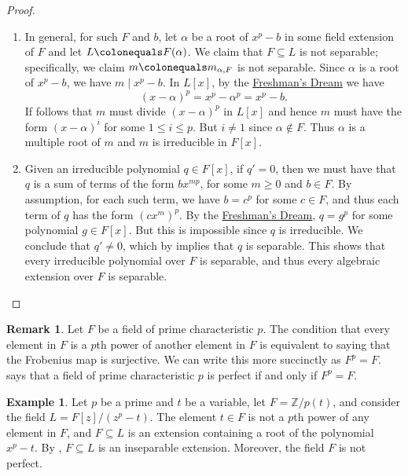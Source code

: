 \documentclass[12pt]{report}
\numberwithin{equation}{section}
\numberwithin{theorem}{chapter}
\theoremstyle{definition}
\newtheorem{example}[theorem]{Example}
\newtheorem*{basic properties}{Basic Properties}
\newtheorem*{Important Remark}{Important Remark}
\newtheorem{remark}[theorem]{Remark}
\begin{document}
\begin{proof}$\,$
\begin{enumerate}[label=\alph*),leftmargin=15pt]
\item In general, for such $F$ and $b$, let $\alpha$ be a root of $x^p - b$ in some field extension of $F$ and let $L \colonequals F(\alpha)$. We claim that $F \subseteq L$ is not separable; specifically, we claim $m \colonequals m_{\alpha, F}$ is not separable.
Since $\alpha$ is a root of $x^p - b$, we have $m \mid x^p - b$. In $L[x]$,
by the \hyperref[freshmans dream]{Freshman's Dream} we have
$$(x-\alpha)^p = x^p - \alpha^p = x^p -b.$$
If follows that $m$ must divide $(x-\alpha)^p$ in $L[x]$ and hence $m$ must have the form $(x-\alpha)^i$ for some $1 \leqslant i \leqslant p$. But $i \neq 1$ since $\alpha \notin F$.
Thus $\alpha$ is a multiple root of $m$ and $m$ is irreducible in $F[x]$.


\item Given an irreducible polynomial $q \in F[x]$, if $q' = 0$, then we must have that $q$ is a sum of terms of the form $b x^{mp}$, for some $m \geqslant 0$ and $b \in F$.
By assumption, for each such term, we have $b = c^p$ for some $c \in F$, and thus each term of $q$ has the form $(cx^m)^p$.
By the \hyperref[freshmans dream]{Freshman's Dream}, $q = g^p$ for some polynomial $g \in F[x]$. But this is impossible since $q$ is irreducible. We conclude that $q' \neq 0$, which by  implies that $q$ is separable. This shows that every irreducible polynomial over $F$ is separable, and thus every algebraic extension over $F$ is separable. 
\qedhere
\end{enumerate}
\end{proof}


\begin{remark}
	Let $F$ be a field of prime characteristic $p$.	The condition that every element in $F$ is a $p$th power of another element in $F$ is equivalent to saying that the Frobenius map is surjective. We can write this more succinctly as $F^p = F$.  says that a field of prime characteristic $p$ is perfect if and only if $F^p = F$.
\end{remark}

\begin{example}
	Let $p$ be a prime and $t$ be a variable, let $F = \mathbb{Z}/p(t)$, and consider the field $L = F[z]/(z^p-t)$. The element $t \in F$ is not a $p$th power of any element in $F$, and $F \subseteq L$ is an extension containing a root of the polynomial $x^p-t$. By , $F \subseteq L$ is an inseparable extension. Moreover, the field $F$ is not perfect.
\end{example}
\end{document}
